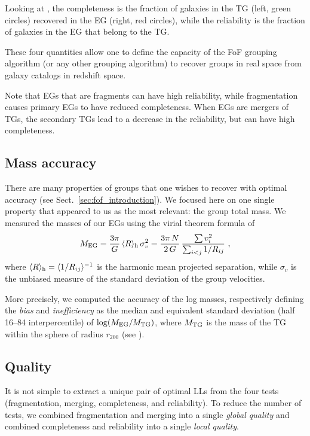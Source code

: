Looking at , the completeness is the fraction of galaxies
in the TG (left, green circles) recovered in the EG (right, red circles), while
the reliability is the fraction of galaxies in the EG that belong to the TG\@.

These four quantities allow one to define the capacity of the FoF grouping
algorithm (or any other grouping algorithm) to recover groups in real space
from galaxy catalogs in redshift space.

Note that EGs that are fragments can have high reliability, while fragmentation
causes primary EGs to have reduced completeness. When EGs are mergers of TGs,
the secondary TGs lead to a decrease in the reliability, but can have high
completeness.

\subsection{Mass accuracy}

There are many properties of groups that one wishes to recover with optimal
accuracy (see Sect.~\ref{sec:fof_introduction}). We focused  here on one single
property that appeared to us as the most relevant: the group total mass. We
measured the masses of our EGs using the virial theorem formula of
\cite*{HTB85}
%
\begin{equation}
    M_{\rm EG} = {3\pi\over G}\,\langle R \rangle_{\rm h} \,\sigma_v^2
    = {3\pi\,N\over 2\,G}\,{\sum v_i^2\over \sum_{i<j} 1/R_{ij}}
    \ ,
\label{eq:MVT}
\end{equation}
%
where $\langle R \rangle_{\rm h} = \langle 1/R_{ij}\rangle^{-1}$ is the
harmonic mean projected separation, while $\sigma_v$ is the unbiased measure of
the standard deviation of the group velocities.

More precisely, we computed the accuracy of the log masses, respectively
defining the \emph{bias} and \emph{inefficiency} as the median and equivalent
standard deviation (half 16--84 interpercentile) of $\log (M_{\rm EG}/M_{\rm
TG})$, where $M_{\rm TG}$ is the mass of the TG within the sphere of radius
$r_{200}$ (see ).

\subsection{Quality}

It is not simple to extract a unique pair of optimal LLs from the four tests
(fragmentation, merging, completeness, and reliability). To reduce the number
of tests, we combined fragmentation and merging into a single \emph{global
quality} and combined completeness and reliability into a single \emph{local
quality}.

